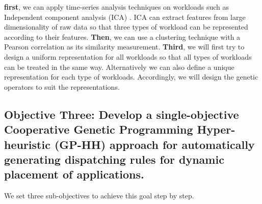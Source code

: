 \begin{itemize}
	 \textbf{first}, we can apply time-series analysis techniques on workloads such as Independent component analysis (ICA) \cite{Hyvarinen:2004vj}. ICA can extract features from large dimensionality of raw data so that three types of workload can be represented according to their features. \textbf{Then}, we can use a clustering technique with a Pearson correlation as its similarity measurement. \textbf{Third}, we will first try to design a uniform representation for all workloads so that all types of workloads can be treated in the same way. Alternatively we can also define a unique representation for each type of workloads. Accordingly, we will design the genetic operators to suit the representations. 


	
	\end{itemize}




\subsection{Objective Three: Develop a single-objective Cooperative Genetic Programming Hyper-heuristic (GP-HH) approach for automatically generating dispatching rules for dynamic placement of applications.}

 We set three sub-objectives to achieve this goal step by step. 

